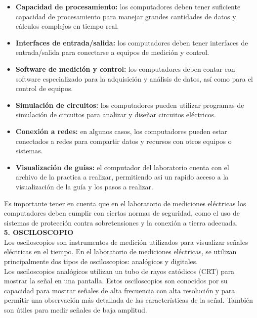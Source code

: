\documentclass[12pt]{article}
\begin{document}
	\begin{itemize}
		\item \textbf{Capacidad de procesamiento:} los computadores deben tener suficiente capacidad de procesamiento para manejar grandes cantidades de datos y cálculos complejos en tiempo real.
		\item \textbf{Interfaces de entrada/salida:} los computadores deben tener interfaces de entrada/salida para conectarse a equipos de medición y control.
		\item \textbf{Software de medición y control:} los computadores deben contar con software especializado para la adquisición y análisis de datos, así como para el control de equipos.
		\item \textbf{Simulación de circuitos:} los computadores pueden utilizar programas de simulación de circuitos para analizar y diseñar circuitos eléctricos.
		\item \textbf{Conexión a redes:} en algunos casos, los computadores pueden estar conectados a redes para compartir datos y recursos con otros equipos o sistemas.
		\item \textbf{Visualización de guías:} el computador del laboratorio cuenta con el archivo de la practica a realizar, permitiendo asi un rapido acceso a la visualización de la guía y los pasos a realizar.
	\end{itemize}
	
	Es importante tener en cuenta que en el laboratorio de mediciones eléctricas los computadores deben cumplir con ciertas normas de seguridad, como el uso de sistemas de protección contra sobretensiones y la conexión a tierra adecuada.\\
	
	\textbf{5. OSCILOSCOPIO}\\
	
	Los osciloscopios son instrumentos de medición utilizados para visualizar señales eléctricas en el tiempo. En el laboratorio de mediciones eléctricas, se utilizan principalmente dos tipos de osciloscopios: analógicos y digitales.\\
	
	Los osciloscopios analógicos utilizan un tubo de rayos catódicos (CRT) para mostrar la señal en una pantalla. Estos osciloscopios son conocidos por su capacidad para mostrar señales de alta frecuencia con alta resolución y para permitir una observación más detallada de las características de la señal. También son útiles para medir señales de baja amplitud.\\
	
\end{document}
